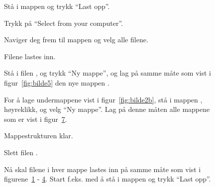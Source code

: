 \begin{figure}[H]
  \centering
  \caption{Stå i mappen  og trykk ``Last opp''.} 
  \label{fig:bilde6}
\end{figure}


\begin{figure}[H]
  \centering
  \caption{Trykk på ``Select from your computer''.} 
  \label{fig:bilde7}
\end{figure}

\begin{figure}[H]
  \centering
  \caption{Naviger deg frem til mappen  og velg alle filene.} 
  \label{fig:bilde8}
\end{figure}


\begin{figure}[H]
  \centering
  \caption{Filene lastes inn.} 
  \label{fig:bilde9}
\end{figure}


\begin{figure}[H]
  \centering
  \caption{Stå i filen , og trykk ``Ny mappe'', og lag
    på samme måte som vist i figur~\ref{fig:bilde5} den nye 
    mappen .} 
  \label{fig:bilde10}
\end{figure}

\begin{figure}[H]
  \centering
  \caption{For å lage undermappene vist i figur~\ref{fig:bilde2b}, 
    stå i mappen , høyreklikk, og velg ``Ny mappe''. Lag på denne
    måten alle
    mappene som er vist i figur~\ref{fig:bilde12}.} 
  \label{fig:bilde11}
\end{figure}

\begin{figure}[H]
  \centering
  \caption{Mappestrukturen klar.} 
  \label{fig:bilde12}
\end{figure}

\begin{figure}[H]
  \centering
  \caption{Slett filen .} 
  \label{fig:bilde14}
\end{figure}

\begin{figure}[H]
  \centering
  \caption{Nå skal filene i hver mappe lastes inn på samme måte
    som vist i figurene~\ref{fig:bilde6} - \ref{fig:bilde9}. 
    Start f.eks. med å stå i mappen  og trykk ``Last opp''.} 
  \label{fig:bilde13}
\end{figure}

